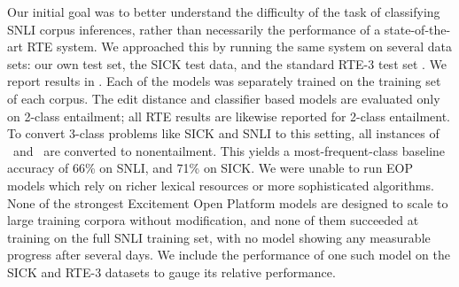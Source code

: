 Our initial goal was to better understand the difficulty of the task of classifying SNLI corpus inferences, rather than necessarily the performance of a state-of-the-art RTE system.
We approached this by running the same system on several data sets:
our own test set,
the SICK test data, and the standard RTE-3 test set \cite{giampiccolo2007third}.
We report results in .
Each of the models was separately trained on the training set of each corpus.
The edit distance and classifier based models are evaluated only on
2-class entailment; all RTE results are likewise reported for 2-class entailment.
To convert 3-class problems like SICK and SNLI to this setting, all instances
  of \contradiction\ and \unknown\ are converted to nonentailment.
This yields a most-frequent-class baseline accuracy of 66\% on SNLI, and 71\% on SICK\@.
We were unable to run EOP models which rely on richer lexical resources or more
  sophisticated algorithms. 
None of the strongest Excitement Open Platform models
  are designed to scale to large training corpora without modification, 
  and none of them succeeded at training on the full SNLI training set, with no 
  model showing any measurable progress after several days.
We include the performance of one such model on the SICK and RTE-3 datasets to
  gauge its relative performance.
  


%
%
